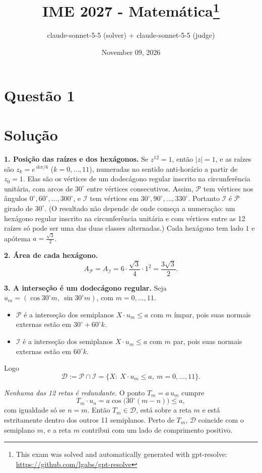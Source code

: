 \documentclass{article}%
\title{IME 2027 - Matemática\thanks{This exam was solved and automatically generated with gpt-resolve: \url{https://github.com/lgabs/gpt-resolve}}}%
\author{claude{-}sonnet{-}5{-}5 (solver) + claude{-}sonnet{-}5{-}5 (judge)}%
\date{November 09, 2026}%
\begin{document}
%
\normalsize%
\maketitle%
\section*{Questão 1}

\section*{Solução}

\textbf{1. Posição das raízes e dos hexágonos.} Se $z^{12}=1$, então $|z|=1$, e as raízes são $z_k=e^{\,ik\pi/6}$ ($k=0,\dots,11$), numeradas no sentido anti-horário a partir de $z_0=1$. Elas são os vértices de um dodecágono regular inscrito na circunferência unitária, com arcos de $30^\circ$ entre vértices consecutivos. Assim, $\mathcal P$ tem vértices nos ângulos $0^\circ,60^\circ,\dots,300^\circ$, e $\mathcal I$ tem vértices em $30^\circ,90^\circ,\dots,330^\circ$. Portanto $\mathcal I$ é $\mathcal P$ girado de $30^\circ$. (O resultado não depende de onde começa a numeração: um hexágono regular inscrito na circunferência unitária e com vértices entre as 12 raízes só pode ser uma das duas classes alternadas.) Cada hexágono tem lado $1$ e apótema $a=\frac{\sqrt3}{2}$.

\textbf{2. Área de cada hexágono.}
\[
A_{\mathcal P}=A_{\mathcal I}=6\cdot\frac{\sqrt3}{4}\cdot1^2=\frac{3\sqrt3}{2}.
\]

\textbf{3. A interseção é um dodecágono regular.} Seja $u_m=(\cos30^\circ m,\ \sin30^\circ m)$, com $m=0,\dots,11$.
\begin{itemize}
\item $\mathcal P$ é a interseção dos semiplanos $X\cdot u_m\le a$ com $m$ ímpar, pois suas normais externas estão em $30^\circ+60^\circ k$.
\item $\mathcal I$ é a interseção dos semiplanos $X\cdot u_m\le a$ com $m$ par, pois suas normais externas estão em $60^\circ k$.
\end{itemize}
Logo
\[
\mathcal D:=\mathcal P\cap\mathcal I=\{X:\ X\cdot u_m\le a,\ m=0,\dots,11\}.
\]

\emph{Nenhuma das 12 retas é redundante.} O ponto $T_m=a\,u_m$ cumpre
\[
T_m\cdot u_n=a\cos\bigl(30^\circ(m-n)\bigr)\le a,
\]
com igualdade só se $n=m$. Então $T_m\in\mathcal D$, está sobre a reta $m$ e está estritamente dentro dos outros 11 semiplanos. Perto de $T_m$, $\mathcal D$ coincide com o semiplano $m$, e a reta $m$ contribui com um lado de comprimento positivo.
\end{document}
